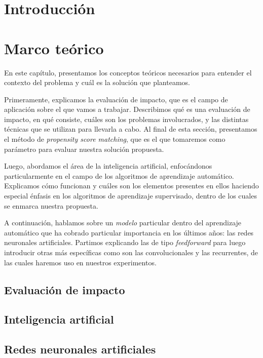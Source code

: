 \documentclass[a4paper,12pt,spanish]{book}
\begin{document}
\tableofcontents
\clearpage

\chapter{Introducción}


\chapter{Marco teórico}
En este capítulo, presentamos los conceptos teóricos necesarios para entender el contexto
del problema y cuál es la solución que planteamos.

Primeramente, explicamos la evaluación de impacto, que es el campo de aplicación sobre el
que vamos a trabajar. Describimos qué es una evaluación de impacto, en qué consiste,
cuáles son los problemas involucrados, y las distintas técnicas que se utilizan para
llevarla a cabo. Al final de esta sección, presentamos el método de \textit{propensity
score matching}, que es el que tomaremos como parámetro para evaluar nuestra solución
propuesta.

Luego, abordamos el área de la inteligencia artificial, enfocándonos particularmente
en el campo de los algoritmos de aprendizaje automático. Explicamos cómo funcionan y
cuáles son los elementos presentes en ellos haciendo especial énfasis en los algoritmos de
aprendizaje supervisado, dentro de los cuales se enmarca nuestra propuesta.

A continuación, hablamos sobre un \textit{modelo} particular dentro del aprendizaje
automático que ha cobrado particular importancia en los últimos años: las redes neuronales
artificiales. Partimos explicando las de tipo \textit{feedforward} para luego introducir
otras más específicas como son las convolucionales y las recurrentes, de las cuales
haremos uso en nuestros experimentos.

\section{Evaluación de impacto}


\section{Inteligencia artificial}


\section{Redes neuronales artificiales} \label{chap:rna}

\end{document}
